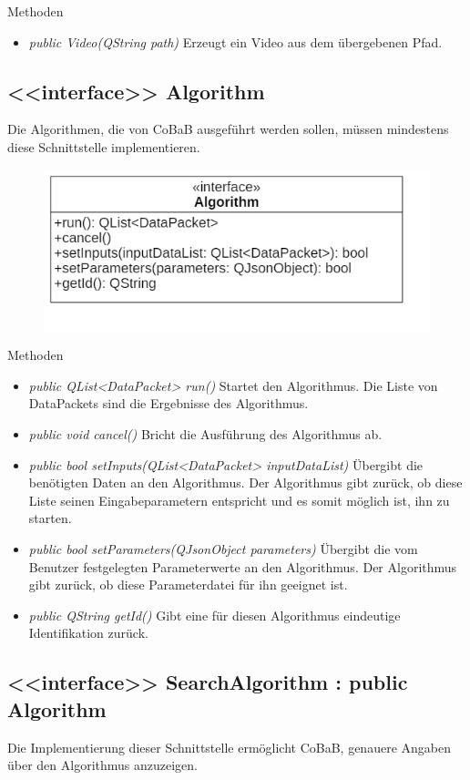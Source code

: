 Methoden
\begin{itemize}
\item \textit{public Video(QString path)} Erzeugt ein Video aus dem übergebenen Pfad.
\end{itemize}

\subsection*{<<interface>> Algorithm}
Die Algorithmen, die von CoBaB ausgeführt werden sollen, müssen mindestens diese Schnittstelle implementieren.

\begin{figure}[H]
\centering
\includegraphics[scale=0.5]{img/Klassendiagramm/Klassen/Algorithm}
\label{fig:algorithm}
\end{figure}

Methoden
\begin{itemize}
\item\textit{public QList<DataPacket> run()} Startet den Algorithmus. Die Liste von DataPackets sind die Ergebnisse des Algorithmus.
\item\textit{public void cancel()} Bricht die Ausführung des Algorithmus ab.
\item\textit{public bool setInputs(QList<DataPacket> inputDataList)} Übergibt die benötigten Daten an den Algorithmus. Der Algorithmus gibt zurück, ob diese Liste seinen Eingabeparametern entspricht und es somit möglich ist, ihn zu starten.
\item\textit{public bool setParameters(QJsonObject parameters)} Übergibt die vom Benutzer festgelegten Parameterwerte an den Algorithmus. Der Algorithmus gibt zurück, ob diese Parameterdatei für ihn geeignet ist.
\item\textit{public QString getId()} Gibt eine für diesen Algorithmus eindeutige Identifikation zurück.
\end{itemize}

\subsection*{<<interface>> SearchAlgorithm : public Algorithm}
Die Implementierung dieser Schnittstelle ermöglicht CoBaB, genauere Angaben über den Algorithmus anzuzeigen.

